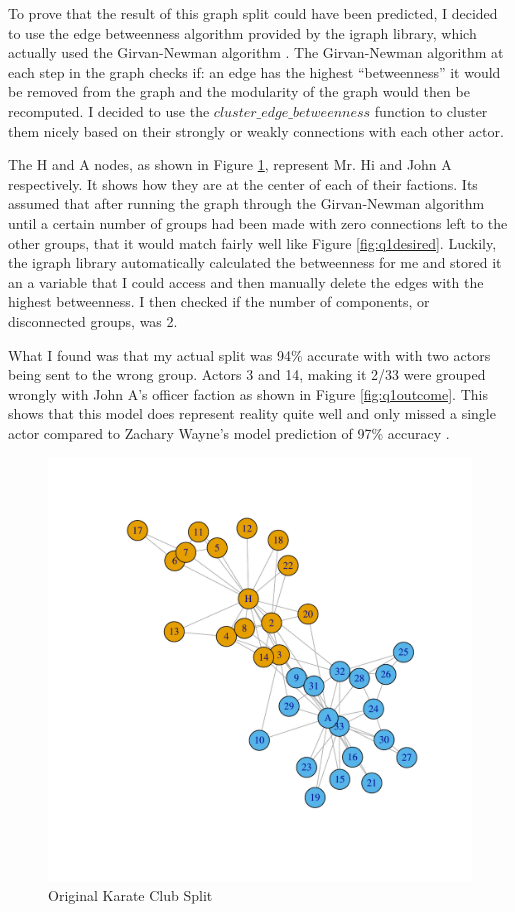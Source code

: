 \documentclass[letterpaper,11pt]{article}
\begin{document}
To prove that the result of this graph split could have been predicted, I decided to use the edge betweenness algorithm provided by the igraph library, which actually used the Girvan-Newman algorithm \cite{commref}. The Girvan-Newman algorithm at each step in the graph checks if: an edge has the highest ``betweenness'' it would be removed from the graph and the modularity of the graph would then be recomputed. I decided to use the $cluster\_edge\_betweenness$ function to cluster them nicely based on their strongly or weakly connections with each other actor.

The H and A nodes, as shown in Figure \ref{fig:q1orig}, represent Mr. Hi and John A respectively. It shows how they are at the center of each of their factions. Its assumed that after running the graph through the Girvan-Newman algorithm until a certain number of groups had been made with zero connections left to the other groups, that it would match fairly well like Figure \ref{fig:q1desired}. Luckily, the igraph library automatically calculated the betweenness for me and stored it an a variable that I could access and then manually delete the edges with the highest betweenness. I then checked if the number of components, or disconnected groups, was 2. 

What I found was that my actual split was 94\% accurate with with two actors being sent to the wrong group. Actors 3 and 14, making it 2/33 were grouped wrongly with John A's officer faction as shown in Figure \ref{fig:q1outcome}. This shows that this model does represent reality quite well and only missed a single actor compared to Zachary Wayne's model prediction of 97\% accuracy \cite{zachref}.

\begin{figure}[h]
\centering
\includegraphics[scale=0.6]{intialGraph.pdf}
\caption{Original Karate Club Split}
\label{fig:q1orig}
\end{figure}
\end{document}
